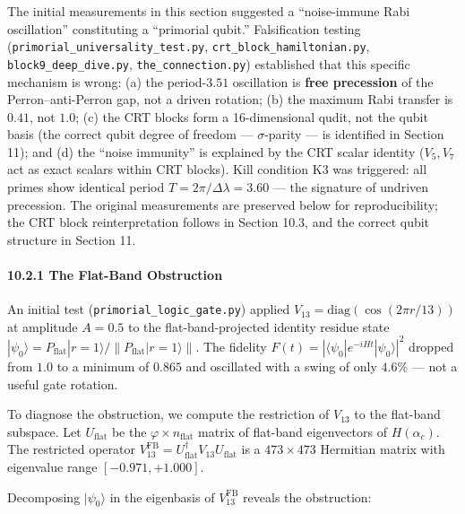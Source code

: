 \documentclass[11pt,letterpaper]{article}
\theoremstyle{definition}
\theoremstyle{remark}
\begin{document}
The initial measurements in this section suggested a ``noise-immune Rabi oscillation'' constituting a ``primorial qubit.'' Falsification testing
(\texttt{primorial\_\hspace{0pt}universality\_\hspace{0pt}test.py}, \texttt{crt\_block\_\hspace{0pt}hamiltonian.py}, \texttt{block9\_\hspace{0pt}deep\_\hspace{0pt}dive.py}, \texttt{the\_connection.py}) established that this specific mechanism is wrong: (a) the period-$3.51$ oscillation is \textbf{free precession} of the Perron--anti-Perron gap, not a driven rotation; (b) the maximum Rabi transfer is $0.41$, not $1.0$; (c) the CRT blocks form a 16-dimensional qudit, not the qubit basis (the correct qubit degree of freedom --- $\sigma$-parity --- is identified in Section 11); and (d) the ``noise immunity'' is explained by the CRT scalar identity ($V_5, V_7$ act as exact scalars within CRT blocks). Kill condition K3 was triggered: all primes show identical period $T = 2\pi/\Delta\lambda = 3.60$ --- the signature of undriven precession. The original measurements are preserved below for reproducibility; the CRT block reinterpretation follows in Section 10.3, and the correct qubit structure in Section 11.

\paragraph{10.2.1 The Flat-Band Obstruction}\label{the-flat-band-obstruction}

An initial test (\texttt{primorial\_logic\_gate.py}) applied $V_{13} = \text{diag}(\cos(2\pi r / 13))$ at amplitude $A = 0.5$ to the flat-band-projected identity residue state $|\psi_0\rangle = P_{\text{flat}} |r=1\rangle / \|P_{\text{flat}} |r=1\rangle\|$. The fidelity $F(t) = |\langle \psi_0 | e^{-iHt} | \psi_0 \rangle|^2$ dropped from $1.0$ to a minimum of $0.865$ and oscillated with a swing of only $4.6\%$ --- not a useful gate rotation.

To diagnose the obstruction, we compute the restriction of $V_{13}$ to the flat-band subspace. Let $U_{\text{flat}}$ be the $\varphi \times n_{\text{flat}}$ matrix of flat-band eigenvectors of $H(\alpha_c)$. The restricted operator $V_{13}^{\text{FB}} = U_{\text{flat}}^\dagger V_{13} U_{\text{flat}}$ is a $473 \times 473$ Hermitian matrix with eigenvalue range $[-0.971, +1.000]$.

Decomposing $|\psi_0\rangle$ in the eigenbasis of $V_{13}^{\text{FB}}$ reveals the obstruction:
\end{document}
